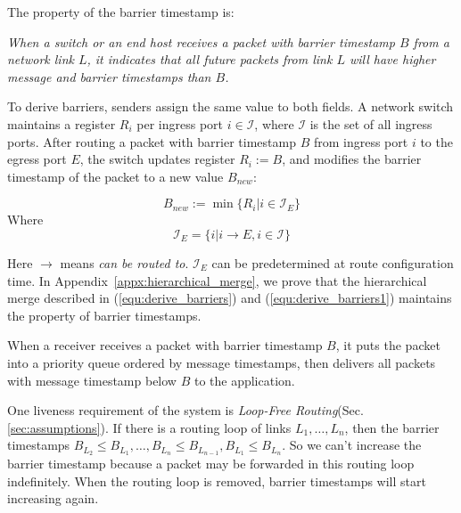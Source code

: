 The property of the barrier timestamp is:

\emph{When a switch or an end host receives a packet with barrier timestamp $B$ from a network link $L$, it indicates that all future packets from link $L$ will have higher message and barrier timestamps than $B$.}

To derive barriers, senders assign the same value to both fields.
A network switch maintains a register $R_i$ per ingress port $i \in \mathcal{I}$, where $\mathcal{I}$ is the set of all ingress ports.
After routing a packet with barrier timestamp $B$ from ingress port $i$ to the egress port $E$, the switch updates register $R_i := B$, and modifies the barrier timestamp of the packet to a new value $B_{new}$:

\begin{equation}\label{equ:derive_barriers}
B_{new}:=\min\{R_i| i\in \mathcal{I}_E\}
\end{equation}
Where 
\begin{equation}\label{equ:derive_barriers1}
\mathcal{I}_E =\{i| i\rightarrow E, i \in \mathcal{I} \}
\end{equation}

Here $\rightarrow$ means \textit{can be routed to}.
$\mathcal{I}_E$ can be predetermined at route configuration time.
In Appendix~\ref{appx:hierarchical_merge}, we prove that the hierarchical merge described in (\ref{equ:derive_barriers}) and (\ref{equ:derive_barriers1}) maintains the property of barrier timestamps.

When a receiver receives a packet with barrier timestamp $B$, it puts the packet into a priority queue ordered by message timestamps, then delivers all packets with message timestamp below $B$ to the application.

One liveness requirement of the system is \textit{Loop-Free Routing}(Sec.\ref{sec:assumptions}).
If there is a routing loop of links $L_1, \ldots , L_n$, then the barrier timestamps $B_{L_2} \leq B_{L_1}, \ldots, B_{L_n} \leq B_{L_{n-1}}, B_{L_1} \leq B_{L_n}$.
So we can't increase the barrier timestamp because a packet may be forwarded in this routing loop indefinitely.
When the routing loop is removed, barrier timestamps will start increasing again.

